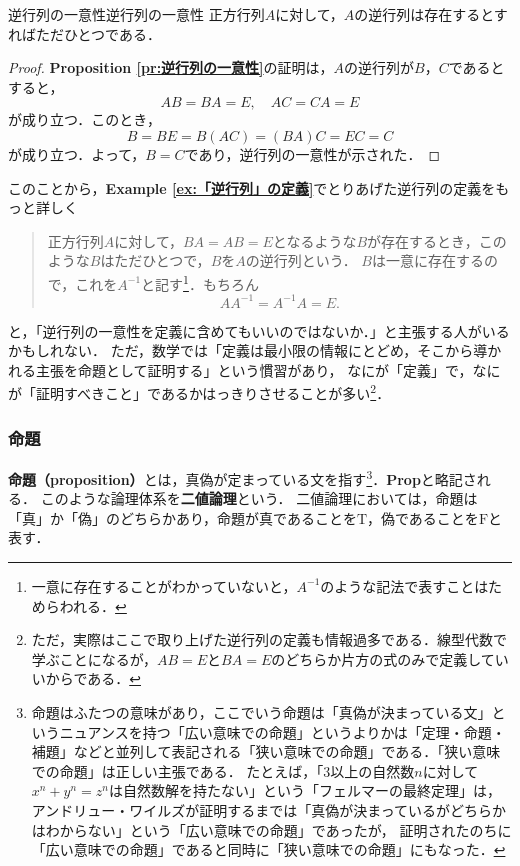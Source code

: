 \documentclass[a4paper,11pt]{ltjsarticle}
\renewcommand{\emph}[1]{\textbf{#1}}
\newenvironment{tleftbar}{\begin{tbleftline}\setlength{\parindent}{1\zw}}{\end{tbleftline}}
\newcommand{\prref}[1]{{\bfseries\sffamily Proposition \ref{pr:#1}}}
\newcommand{\exref}[1]{{\bfseries\sffamily Example \ref{ex:#1}}}
\begin{document}
\begin{prop}{逆行列の一意性}{逆行列の一意性}
	正方行列$A$に対して，$A$の逆行列は存在するとすればただひとつである．
\end{prop}

\begin{tleftbar}
	\begin{proof}
	\prref{逆行列の一意性}の証明は，$A$の逆行列が$B$，$C$であるとすると，
	\[
		AB=BA=E,\quad AC=CA=E
	\]
	が成り立つ．このとき，
	\[
		B=BE=B(AC)=(BA)C=EC=C
	\]
	が成り立つ．よって，$B=C$であり，逆行列の一意性が示された．
	\end{proof}
\end{tleftbar}

このことから，\exref{「逆行列」の定義}でとりあげた逆行列の定義をもっと詳しく

\begin{quote}
	正方行列$A$に対して，$BA = AB =E$となるような$B$が存在するとき，このような$B$はただひとつで，$B$を$A$の逆行列という．
	$B$は一意に存在するので，これを$A^{-1}$と記す\footnote{一意に存在することがわかっていないと，$A^{-1}$のような記法で表すことはためらわれる．}．もちろん
	\[
		AA^{-1}=A^{-1}A=E.
	\]
\end{quote}
と，「逆行列の一意性を定義に含めてもいいのではないか．」と主張する人がいるかもしれない．
ただ，数学では「定義は最小限の情報にとどめ，そこから導かれる主張を命題として証明する」という慣習があり，
なにが「定義」で，なにが「証明すべきこと」であるかはっきりさせることが多い\footnote{ただ，実際はここで取り上げた逆行列の定義も情報過多である．線型代数で学ぶことになるが，$AB=E$と$BA=E$のどちらか片方の式のみで定義していいからである．}．

\subsubsection{命題}

\emph{命題（proposition）}とは，真偽が定まっている文を指す\footnote{命題はふたつの意味があり，ここでいう命題は「真偽が決まっている文」というニュアンスを持つ「広い意味での命題」というよりかは「定理・命題・補題」などと並列して表記される「狭い意味での命題」である．「狭い意味での命題」は正しい主張である．
	たとえば，「$3$以上の自然数$n$に対して$x^n + y^n =z^n$は自然数解を持たない」という「フェルマーの最終定理」は，
	アンドリュー・ワイルズが証明するまでは「真偽が決まっているがどちらかはわからない」という「広い意味での命題」であったが，
	証明されたのちに「広い意味での命題」であると同時に「狭い意味での命題」にもなった．}．\textbf{Prop}と略記される．
このような論理体系を\emph{二値論理}という．
二値論理においては，命題は「真」か「偽」のどちらかあり，命題が真であることを$\mathrm{T}$，偽であることを$\mathrm{F}$と表す．
\end{document}
